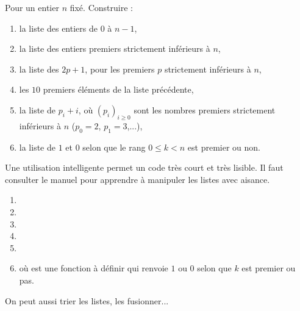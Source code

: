 \documentclass[class=report,crop=false]{standalone}
\begin{document}
\begin{tp}
Pour un entier $n$ fixé. Construire : %
\begin{enumerate}
  \item la liste des entiers de $0$ à $n-1$,
  
  \item la liste des entiers premiers strictement inférieurs à $n$,
  
  \item la liste des $2p+1$, pour les premiers $p$ strictement inférieurs à $n$,
  
  \item les $10$ premiers éléments de la liste précédente,
    
  \item la liste de $p_i+i$, où $(p_i)_{i\ge0}$ sont les nombres premiers 
  strictement inférieurs à $n$ ($p_0=2$, $p_1=3$,...),
  
  \item la liste de $1$ et $0$ selon que le rang $0\le k <n$ est premier ou non.
\end{enumerate} 
\end{tp}


Une utilisation intelligente permet un code très court et très lisible.
Il faut consulter le manuel pour apprendre à manipuler les listes avec aisance.
\begin{enumerate}
  \item {}
  \item {} 
  \item {}
  \item {}
  \item {}
  \item {} 
  où  est une fonction à définir qui renvoie $1$ ou $0$ 
  selon que $k$ est premier ou pas. 
\end{enumerate}

On peut aussi trier les listes, les fusionner...
\end{document}
